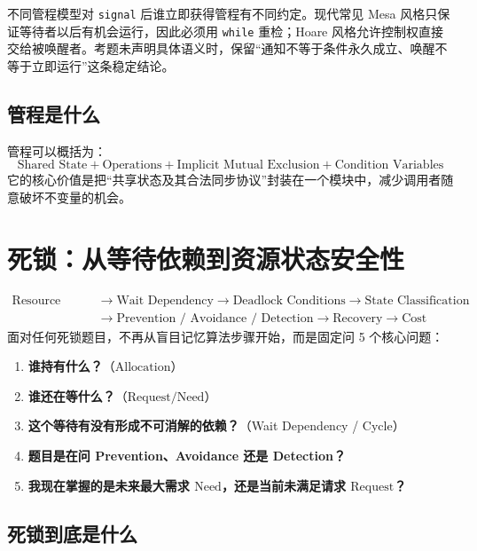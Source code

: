 \documentclass[11pt,a4paper]{ctexart}
\newcommand{\kw}[1]{\textbf{#1}}
\newcommand{\code}[1]{\texttt{#1}}
\begin{document}
\begin{eng}
不同管程模型对 \code{signal} 后谁立即获得管程有不同约定。现代常见 Mesa 风格只保证等待者以后有机会运行，因此必须用 \code{while} 重检；Hoare 风格允许控制权直接交给被唤醒者。考题未声明具体语义时，保留“通知不等于条件永久成立、唤醒不等于立即运行”这条稳定结论。
\end{eng}

\subsection{管程是什么}

管程可以概括为：
\[
\boxed{
\text{Shared State}
+
\text{Operations}
+
\text{Implicit Mutual Exclusion}
+
\text{Condition Variables}
}
\]
它的核心价值是把“共享状态及其合法同步协议”封装在一个模块中，减少调用者随意破坏不变量的机会。

\section{死锁：从等待依赖到资源状态安全性}

\begin{corebox}[死锁分析核心控制流]
\[
\boxed{
\begin{aligned}
\text{Resource State} &\to \text{Wait Dependency} \to \text{Deadlock Conditions} \to \text{State Classification} \\
&\to \text{Prevention / Avoidance / Detection} \to \text{Recovery} \to \text{Cost}
\end{aligned}
}
\]
面对任何死锁题目，不再从盲目记忆算法步骤开始，而是固定问 5 个核心问题：
\begin{enumerate}
\item \kw{谁持有什么？}（$\text{Allocation}$）
\item \kw{谁还在等什么？}（$\text{Request} / \text{Need}$）
\item \kw{这个等待有没有形成不可消解的依赖？}（Wait Dependency / Cycle）
\item \kw{题目是在问 Prevention、Avoidance 还是 Detection？}
\item \kw{我现在掌握的是未来最大需求 $\text{Need}$，还是当前未满足请求 $\text{Request}$？}
\end{enumerate}
\end{corebox}

\subsection{死锁到底是什么}
\end{document}
